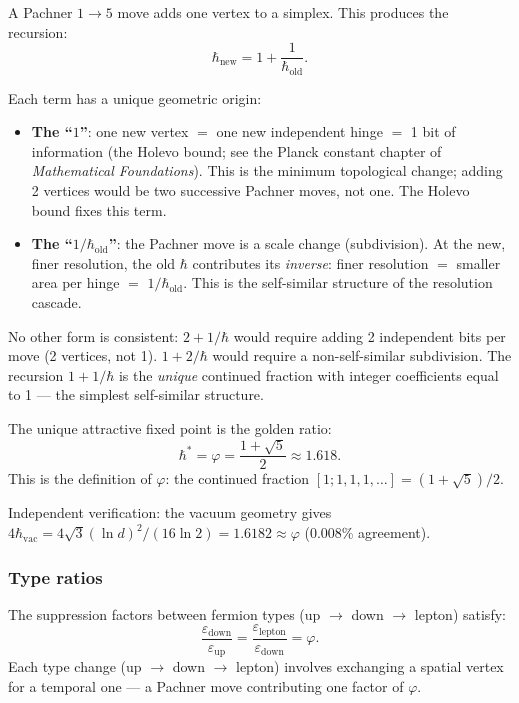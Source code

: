 A Pachner $1 \to 5$ move adds one vertex to a simplex. This produces the recursion:
\begin{equation}
\hbar_\text{new} = 1 + \frac{1}{\hbar_\text{old}}.
\end{equation}

Each term has a unique geometric origin:
\begin{itemize}
\item \textbf{The ``$1$''}: one new vertex $=$ one new independent hinge $=$ 1 bit of information (the Holevo bound; see the Planck constant chapter of \textit{Mathematical Foundations}). This is the minimum topological change; adding 2 vertices would be two successive Pachner moves, not one. The Holevo bound fixes this term.
\item \textbf{The ``$1/\hbar_\text{old}$''}: the Pachner move is a scale change (subdivision). At the new, finer resolution, the old $\hbar$ contributes its \emph{inverse}: finer resolution $=$ smaller area per hinge $=$ $1/\hbar_\text{old}$. This is the self-similar structure of the resolution cascade.
\end{itemize}

No other form is consistent: $2 + 1/\hbar$ would require adding 2 independent bits per move (2 vertices, not 1). $1 + 2/\hbar$ would require a non-self-similar subdivision. The recursion $1 + 1/\hbar$ is the \emph{unique} continued fraction with integer coefficients equal to 1 --- the simplest self-similar structure.

The unique attractive fixed point is the golden ratio:
\begin{equation}
\hbar^* = \varphi = \frac{1 + \sqrt{5}}{2} \approx 1.618.
\end{equation}
This is the definition of $\varphi$: the continued fraction $[1; 1, 1, 1, \ldots] = (1+\sqrt{5})/2$.

Independent verification: the vacuum geometry gives $4\hbar_\text{vac} = 4\sqrt{3}(\ln d)^2/(16\ln 2) = 1.6182 \approx \varphi$ (0.008\% agreement).

\subsubsection{Type ratios}

The suppression factors between fermion types (up $\to$ down $\to$ lepton) satisfy:
\begin{equation}
\frac{\varepsilon_\text{down}}{\varepsilon_\text{up}} = \frac{\varepsilon_\text{lepton}}{\varepsilon_\text{down}} = \varphi.
\end{equation}
Each type change (up $\to$ down $\to$ lepton) involves exchanging a spatial vertex for a temporal one --- a Pachner move contributing one factor of $\varphi$.


